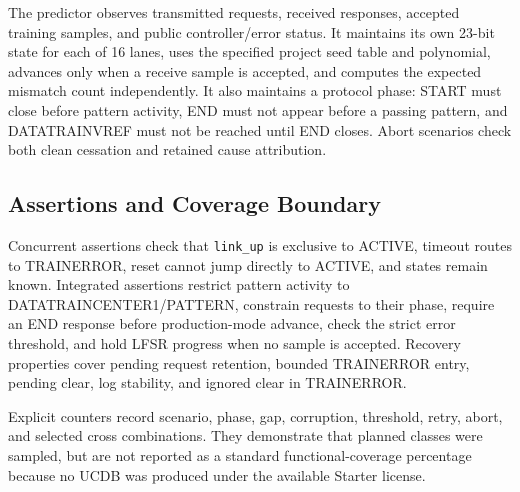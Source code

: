 The predictor observes transmitted requests, received responses, accepted
training samples, and public controller/error status. It maintains its own
23-bit state for each of 16 lanes, uses the specified project seed table and
polynomial, advances only when a receive sample is accepted, and computes the
expected mismatch count independently. It also maintains a protocol phase:
START must close before pattern activity, END must not appear before a passing
pattern, and DATATRAINVREF must not be reached until END closes. Abort scenarios
check both clean cessation and retained cause attribution.

\subsection{Assertions and Coverage Boundary}

Concurrent assertions check that \texttt{link\_up} is exclusive to ACTIVE,
timeout routes to TRAINERROR, reset cannot jump directly to ACTIVE, and states
remain known. Integrated assertions restrict pattern activity to
DATATRAINCENTER1/PATTERN, constrain requests to their phase, require an END
response before production-mode advance, check the strict error threshold, and
hold LFSR progress when no sample is accepted. Recovery properties cover
pending request retention, bounded TRAINERROR entry, pending clear, log
stability, and ignored clear in TRAINERROR.

Explicit counters record scenario, phase, gap, corruption, threshold, retry,
abort, and selected cross combinations. They demonstrate that planned classes
were sampled, but are not reported as a standard functional-coverage percentage
because no UCDB was produced under the available Starter license.
